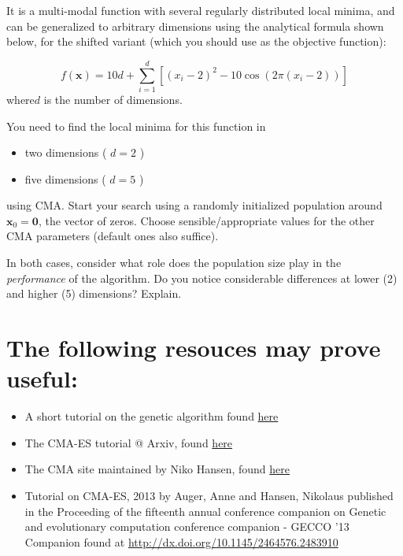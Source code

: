 \documentclass[11pt]{article}
\begin{document}
It is a multi-modal function with several regularly distributed local minima,
and can be generalized to arbitrary dimensions using the analytical formula
shown below, for the shifted variant (which you should use as the objective
function):

\begin{equation}
f(\mathbf{x}) = 10d + \sum_{i=1}^{d} \left[ (x_i - 2)^2 - 10 \cos\left(2 \pi (x_i - 2) \right) \right]
\end{equation}
where\(d\) is the number of dimensions.


You need to find the local minima for this function in
\begin{itemize}
\item two dimensions ( \(d = 2\) )
\item five dimensions ( \(d = 5\) )
\end{itemize}
using CMA. Start your search using a randomly initialized population around \(\mathbf{x}_0 = \mathbf{0}\), the vector of zeros. Choose sensible/appropriate values for
the other CMA parameters (default ones also suffice).

In both cases, consider what role does the population size play in the
\emph{performance} of the algorithm. Do you notice considerable differences at lower
(2) and higher (5) dimensions? Explain.

\section{The following resouces may prove useful:}
\label{sec:references}
\begin{itemize}
\item A short tutorial on the genetic algorithm found \href{http://web.cs.ucdavis.edu/\~vemuri/classes/ecs271/Genetic\%2520Algorithms\%2520Short\%2520Tutorial.htm}{here}
\item The CMA-ES tutorial @ Arxiv, found \href{https://arxiv.org/pdf/1604.00772.pdf}{here}
\item The CMA site maintained by Niko Hansen, found \href{http://cma.gforge.inria.fr/index.html}{here}
\item Tutorial on CMA-ES, 2013 by Auger, Anne and Hansen, Nikolaus published in the
Proceeding of the fifteenth annual conference companion on Genetic and
evolutionary computation conference companion - GECCO ’13 Companion found at \url{http://dx.doi.org/10.1145/2464576.2483910}
\end{itemize}
\end{document}
